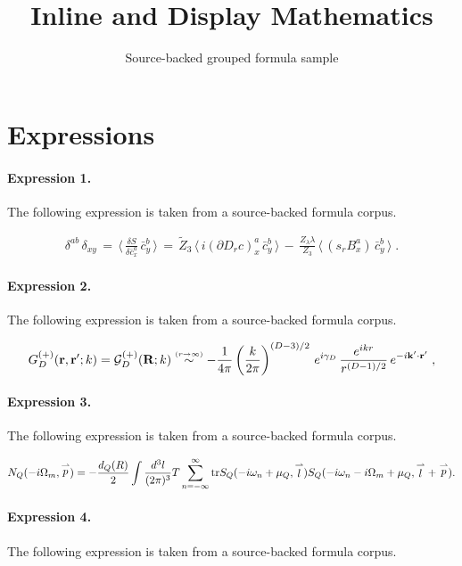 \documentclass[11pt]{article}
\title{Inline and Display Mathematics}
\author{Source-backed grouped formula sample}
\date{}
\begin{document}
\maketitle
\section{Expressions}
\paragraph{Expression 1.} The following expression is taken from a source-backed formula corpus.

\begin{align*} \delta^{ab} \, \delta_{xy}\, =\, \langle \, \frac{\delta S}{\delta\bar c^a_x} \, \bar c^b_y\, \rangle\, =\, \widetilde Z_3 \, \langle \, i (\partial D_r c)^a_x \, \bar c^b_y\, \rangle \, - \,\frac{Z_\lambda \lambda }{Z_3} \,\langle \, (s_r B^a_x ) \, \bar c^b_y\, \rangle \; .\end{align*}

\paragraph{Expression 2.} The following expression is taken from a source-backed formula corpus.

\begin{align*}G^{(+)}_{{D}}({\bf r}, {\bf r}';k)={\mathcal G}^{(+)}_{{D}}({\bf R};k) \stackrel{\scriptscriptstyle(r \rightarrow \infty)}{\sim}- \frac{1}{4\pi}\left( \frac{k}{2 \pi} \right)^{({D}-3)/2}\, e^{i\gamma_{{D}}}\,\frac{e^{ikr}}{r^{({D} -1)/2}} \, e^{-i {\bf k}' \cdot {\bf r}'}\; ,\end{align*}

\paragraph{Expression 3.} The following expression is taken from a source-backed formula corpus.

\begin{align*}N_{Q}(-i\Omega_m, \stackrel{\rightharpoonup}{p})=-\frac{d_Q(R)}{2}\int \frac{d^3l}{(2\pi)^3} T\sum_{n=-\infty}^{\infty}{\rm tr} S_Q(-i\omega_n+\mu_Q, \stackrel{\rightharpoonup}{l}) S_Q(-i\omega_n-i\Omega_m+\mu_Q, \stackrel{\rightharpoonup}{l} + \stackrel{\rightharpoonup}{p}).\end{align*}

\paragraph{Expression 4.} The following expression is taken from a source-backed formula corpus.
\end{document}

